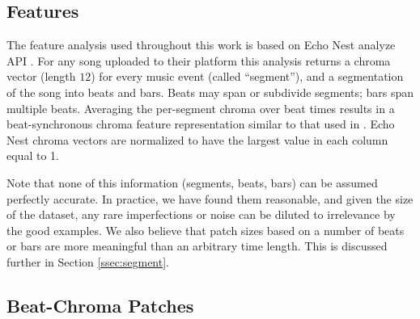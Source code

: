 \documentclass{article}
\newcommand{\eg}{e.g.~}
\begin{document}
\subsection{Features}
The feature analysis used throughout this work is based on Echo Nest
analyze API \cite{EchoNest}.  
%
For any song uploaded to their platform this analysis returns a chroma
vector (length $12$) for every music event (called ``segment''), and a
segmentation of the song into beats and bars. Beats may span or 
subdivide segments; bars span multiple beats.
%
Averaging the per-segment chroma over beat times results in a
beat-synchronous chroma feature representation similar to that used in
\cite{Ellis2007a}.  Echo Nest chroma vectors are normalized to have the 
largest value in each column equal to 1.


Note that none of this information (segments, beats, bars)
can be assumed perfectly accurate.
In practice, we have found them reasonable, 
and given the size of the dataset, any rare imperfections or noise
can be diluted to irrelevance by the good examples.  
We also believe that patch sizes based on a number of beats or bars are more
meaningful than an arbitrary time length. This is discussed further in 
Section \ref{ssec:segment}.


\subsection{Beat-Chroma Patches} \label{ssec:beatpatch}
\end{document}
